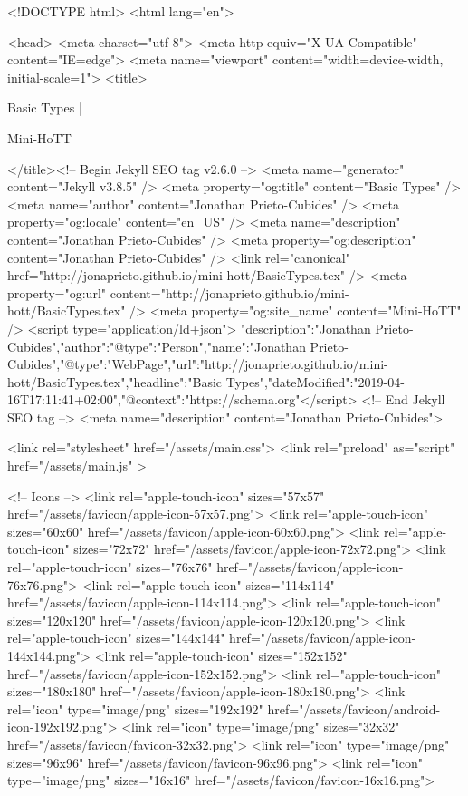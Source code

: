 <!DOCTYPE html>
<html lang="en">

<head>
  <meta charset="utf-8">
  <meta http-equiv="X-UA-Compatible" content="IE=edge">
  <meta name="viewport" content="width=device-width, initial-scale=1">
  <title>
    
      
        Basic Types |
      
        Mini-HoTT
    
  </title><!-- Begin Jekyll SEO tag v2.6.0 -->
<meta name="generator" content="Jekyll v3.8.5" />
<meta property="og:title" content="Basic Types" />
<meta name="author" content="Jonathan Prieto-Cubides" />
<meta property="og:locale" content="en_US" />
<meta name="description" content="Jonathan Prieto-Cubides" />
<meta property="og:description" content="Jonathan Prieto-Cubides" />
<link rel="canonical" href="http://jonaprieto.github.io/mini-hott/BasicTypes.tex" />
<meta property="og:url" content="http://jonaprieto.github.io/mini-hott/BasicTypes.tex" />
<meta property="og:site_name" content="Mini-HoTT" />
<script type="application/ld+json">
{"description":"Jonathan Prieto-Cubides","author":{"@type":"Person","name":"Jonathan Prieto-Cubides"},"@type":"WebPage","url":"http://jonaprieto.github.io/mini-hott/BasicTypes.tex","headline":"Basic Types","dateModified":"2019-04-16T17:11:41+02:00","@context":"https://schema.org"}</script>
<!-- End Jekyll SEO tag -->
<meta name="description" content="Jonathan Prieto-Cubides">

  <link rel="stylesheet" href="/assets/main.css">
  <link rel="preload" as="script" href="/assets/main.js" >

  <!-- Icons -->
  <link rel="apple-touch-icon" sizes="57x57" href="/assets/favicon/apple-icon-57x57.png">
  <link rel="apple-touch-icon" sizes="60x60" href="/assets/favicon/apple-icon-60x60.png">
  <link rel="apple-touch-icon" sizes="72x72" href="/assets/favicon/apple-icon-72x72.png">
  <link rel="apple-touch-icon" sizes="76x76" href="/assets/favicon/apple-icon-76x76.png">
  <link rel="apple-touch-icon" sizes="114x114" href="/assets/favicon/apple-icon-114x114.png">
  <link rel="apple-touch-icon" sizes="120x120" href="/assets/favicon/apple-icon-120x120.png">
  <link rel="apple-touch-icon" sizes="144x144" href="/assets/favicon/apple-icon-144x144.png">
  <link rel="apple-touch-icon" sizes="152x152" href="/assets/favicon/apple-icon-152x152.png">
  <link rel="apple-touch-icon" sizes="180x180" href="/assets/favicon/apple-icon-180x180.png">
  <link rel="icon" type="image/png" sizes="192x192"  href="/assets/favicon/android-icon-192x192.png">
  <link rel="icon" type="image/png" sizes="32x32" href="/assets/favicon/favicon-32x32.png">
  <link rel="icon" type="image/png" sizes="96x96" href="/assets/favicon/favicon-96x96.png">
  <link rel="icon" type="image/png" sizes="16x16" href="/assets/favicon/favicon-16x16.png">

